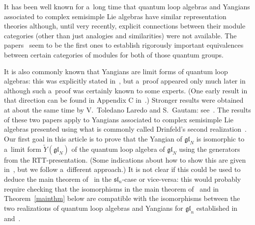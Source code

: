 \documentclass[pdftex]{sigma}
\numberwithin{theorem}{section}
\numberwithin{proposition}{section}
\numberwithin{lemma}{section}
\numberwithin{corollary}{section}
\numberwithin{definition}{section}
\numberwithin{example}{section}
\numberwithin{remark}{section}
\numberwithin{note}{section}
\numberwithin{equation}{section}
\begin{document}
It has been well known for a~long time that quantum loop algebras and Yangians associated to complex semisimple Lie
algebras have similar representation theories although, until very recently, explicit connections between their module
categories (other than just analogies and similarities) were not available.
The papers~\cite{GaTL2,GaTL3} seem to be the f\/irst ones to establish rigorously important equivalences between certain
categories of modules for both of those quantum groups.

It is also commonly known that Yangians are limit forms of quantum loop algebras: this was explicitly stated
in~\cite{Dr1}, but a~proof appeared only much later in~\cite{GuMa} although such a~proof was certainly known to some
experts.
(One early result in that direction can be found in Appendix C in~\cite{BeLe}.) Stronger results were obtained at about
the same time by V.~Toledano Laredo and S.~Gautam: see~\cite{GaTL1}.
The results of these two papers apply to Yangians associated to complex semisimple Lie algebras presented using what is
commonly called Drinfeld's second realization~\cite{Dr2}.
Our f\/irst goal in this article is to prove that the Yangian of $\mathfrak{gl}_N$ is isomorphic to a~limit
form $\widetilde{Y}(\mathfrak{gl}_N)$ of the quantum loop algebra of $\mathfrak{gl}_N$ using the
generators from the RTT-presentation.
(Some indications about how to show this are given in~\cite{Ch}, but we follow a~dif\/ferent approach.) It is not clear if
this could be used to deduce the main theorem of~\cite{GuMa} in the \mbox{$\mathfrak{s}\mathfrak{l}_n$-case} or vice-versa:
this would probably require checking that the isomorphisms in the main theorem of~\cite{GuMa} and in
Theorem~\ref{mainthm} below are compatible with the isomorphisms between the two realizations of quantum loop algebras
and Yangians for $\mathfrak{gl}_n$ established in~\cite{DiFr} and~\cite{BrKl}.
\end{document}
